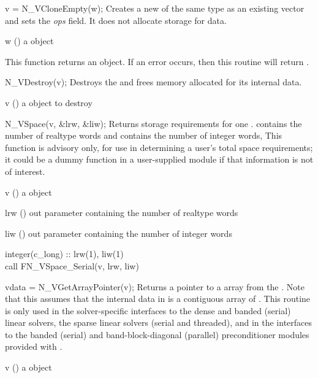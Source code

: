 {
  v = N\_VCloneEmpty(w);
}
{
  Creates a new  of the same type as an existing vector  and sets the
  {\em ops} field. It does not allocate storage for data.
}
{
  \begin{args}[w]
  \item[w] () a {\nvector} object
  \end{args}
}
{
  This function returns an  object. If an error occurs, then this
  routine will return .
}
{}

{
  N\_VDestroy(v);
}
{
  Destroys the   and frees memory allocated for its
  internal data.
}
{
  \begin{args}[v]
  \item[v] () a {\nvector} object to destroy
  \end{args}
}
{}
{}

{
  N\_VSpace(v, \&lrw, \&liw);
}
{
  Returns storage requirements for one .
   contains the number of realtype words and 
  contains the number of integer words, This function is advisory
  only, for use in determining a user's total space requirements;
  it could be a dummy function in a user-supplied
  {\nvector} module if that information is not of interest.
}
{
  \begin{args}[v]
  \item[v] () a {\nvector} object
  \item[lrw] () out parameter containing the number of realtype words
  \item[liw] () out parameter containing the number of integer words
  \end{args}
}
{}
{}
{
  integer(c\_long) :: lrw(1), liw(1)\\
  call FN\_VSpace\_Serial(v, lrw, liw)
}

{
  vdata = N\_VGetArrayPointer(v);
}
{
  Returns a pointer to a  array from the  .
  Note that this assumes that the internal data in  is
  a contiguous array of . This routine is only used in the
  solver-specific interfaces to the dense and banded (serial) linear
  solvers, the sparse linear solvers (serial and threaded), and in the
  interfaces to the banded (serial) and band-block-diagonal (parallel)
  preconditioner modules provided with {\sundials}.
}
{
  \begin{args}[v]
  \item[v] () a {\nvector} object
  \end{args}
}
{
}
{}

